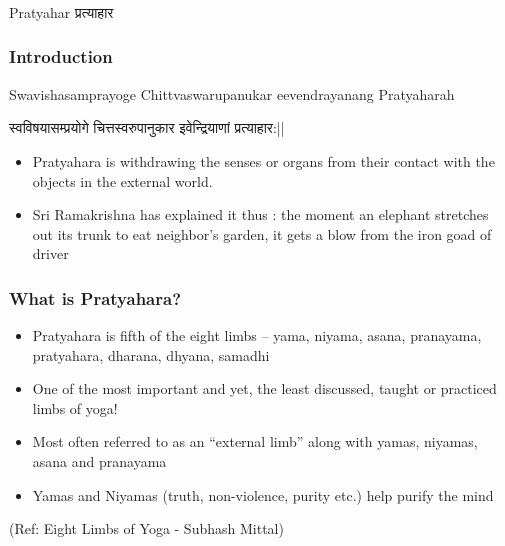 \begin{frame}[fragile]\frametitle{}
\begin{center}
{\Large Pratyahar प्रत्याहार}
\end{center}
\end{frame}

\begin{frame}[fragile]\frametitle{Introduction}

Swavishasamprayoge Chittvaswarupanukar eevendrayanang Pratyaharah

स्वविषयासम्प्रयोगे चित्तस्वरुपानुकार इवेन्द्रियाणां प्रत्याहार:||

	\begin{itemize}
	\item Pratyahara  is  withdrawing 
the  senses  or  organs  from 
their  contact  with  the 
objects  in  the  external 
world.  
	\item Sri  Ramakrishna  has 
explained  it  thus  :  the 
moment  an  elephant 
stretches out its trunk to eat 
neighbor’s  garden,  it  gets  a 
blow  from  the  iron  goad  of 
driver 
	\end{itemize}

\end{frame}



\begin{frame}[fragile]\frametitle{What is Pratyahara?}


	\begin{itemize}
	\item Pratyahara is fifth of the eight limbs – yama, 
niyama, asana, pranayama, pratyahara, 
dharana, dhyana, samadhi
	\item One of the most important and yet, the least 
discussed, taught or practiced limbs of yoga!
	\item Most often referred to as an “external limb” 
along with yamas, niyamas, asana and 
pranayama
	\item Yamas and Niyamas (truth, non-violence, 
purity etc.) help purify the mind
	\end{itemize}

\tiny{(Ref: Eight Limbs of Yoga - Subhash Mittal)}

\end{frame}

